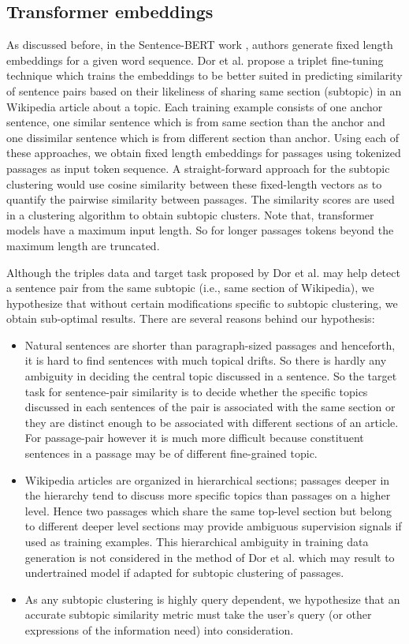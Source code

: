 \subsection{Transformer embeddings} As discussed before, in the Sentence-BERT work \cite{reimers2019sentence}, authors generate fixed length embeddings for a given word sequence. Dor et al. \cite{dor2018learning} propose a triplet fine-tuning technique which trains the embeddings to be better suited in predicting similarity of sentence pairs based on their likeliness of sharing same section (subtopic) in an Wikipedia article about a topic. Each training example consists of one anchor sentence, one similar sentence which is from same section than the anchor and one dissimilar sentence which is from different section than anchor. Using each of these approaches, we obtain fixed length embeddings for passages using tokenized passages as input token sequence. A straight-forward approach for the subtopic clustering would use cosine similarity between these fixed-length vectors as to quantify the pairwise similarity between passages. The similarity scores are used in  a clustering algorithm to obtain subtopic clusters. Note that, transformer models have a maximum input length. So for longer passages tokens beyond the maximum length are truncated.

Although the triples data and target task proposed by Dor et al. may help detect a sentence pair from the same subtopic (i.e., same section of Wikipedia), we hypothesize that without certain modifications specific to subtopic clustering, we obtain sub-optimal results. There are several reasons behind our hypothesis: 
\begin{itemize}[leftmargin=.15in]
    \item Natural sentences are shorter than paragraph-sized passages and henceforth, it is hard to find sentences with much topical drifts. So there is hardly any ambiguity in deciding the central topic discussed in a sentence. So the target task for sentence-pair similarity is to decide whether the specific topics discussed in each sentences of the pair is associated with the same section or they are distinct enough to be associated with different sections of an article. For passage-pair however it is much more difficult because constituent sentences in a passage may be of different fine-grained topic.
    \item Wikipedia articles are organized in hierarchical sections; passages deeper in the hierarchy tend to discuss more specific topics than passages on a higher level. Hence two passages which share the same top-level section but belong to different deeper level sections may provide ambiguous supervision signals if used as training examples. This hierarchical ambiguity in training data generation is not considered in the method of Dor et al. which may result to undertrained model if adapted for subtopic clustering of passages.
    \item As any subtopic clustering is highly query dependent, we hypothesize that an accurate subtopic similarity metric must take the user's query (or other expressions of the information need) into consideration.
\end{itemize}


